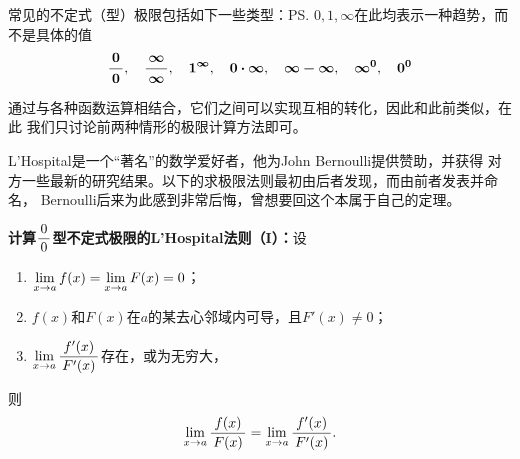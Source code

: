 常见的不定式（型）极限包括如下一些类型：\ps{$0,1,\infty$在此均表示一种趋势，而不是具体的值}
$$\bm{\displaystyle\frac{\,{0}\,}{\,{0}\,}}, \quad \bm{\displaystyle\frac{\,{\infty}\,}{\,{\infty}\,}}, \quad
\bm{1^{\infty}}, \quad \bm{0\cdot\infty}, \quad
\bm{\infty-\infty}, \quad \bm{\infty^0}, \bm{\quad 0^0}$$
\begin{center}
\end{center}
通过与各种函数运算相结合，它们之间可以实现互相的转化，因此和此前类似，在此
我们只讨论前两种情形的极限计算方法即可。


L'Hospital是一个“著名”的数学爱好者，他为John Bernoulli提供赞助，并获得
对方一些最新的研究结果。以下的求极限法则最初由后者发现，而由前者发表并命名，
Bernoulli后来为此感到非常后悔，曾想要回这个本属于自己的定理。

\begin{thx}
	{\bf 计算$\displaystyle\frac{\,{0}\,}{\,{0}\,}$型不定式极限的L'Hospital法则（I）：}设
	\begin{enumerate}[(1)]
	  \item $\lim\limits_{x\to{a}}f(x)=\lim\limits_{x\to{a}}F(x)=0$；
	  \item $f(x)$和$F(x)$在$a$的某去心邻域内可导，且$F'(x)\ne0$；
	  \item $\lim\limits_{x\to{a}}\displaystyle\frac{\,{f'(x)}\,}{\,{F'(x)}\,}$存在，或为无穷大，
	\end{enumerate}
	则
	$$\lim\limits_{x\to{a}}\displaystyle\frac{\,{f(x)}\,}{\,{F(x)}\,}=\lim\limits_{x\to{a}}\displaystyle\frac{\,{f'(x)}\,}{\,{F'(x)}\,}.$$
\end{thx}

